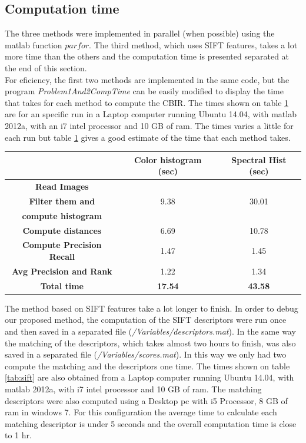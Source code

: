 \documentclass[a4paper,12pt]{article}
\begin{document}
\subsection{Computation time}
The three methods were implemented in parallel (when possible) using the
matlab function $parfor$. The third method, which uses SIFT features,
takes a lot more time than the others and the computation time is presented separated
at the end of this section. \\

For eficiency, the first two methods are implemented in the same code, but the program 
\emph{Problem1And2CompTime} can be easily modified to display the time that
takes for each method to compute the CBIR. The times shown on table \ref{tab:times}
are for an specific run in a Laptop computer running Ubuntu 14.04, with matlab 2012a, 
with an i7 intel processor and 10 GB of ram. The times varies a little for each run
but table \ref{tab:times} gives a good estimate of the time that each method takes.
\begin{table}[h!]
    \centering
    \begin{tabular}{|c|c|c|}
        \hline
        & \textbf{Color histogram (sec)} & \textbf{Spectral Hist (sec)} \\
        \hline
        \textbf{Read Images} & & \\
        \textbf{Filter them and} & 9.38 & 30.01 \\
        \textbf{compute histogram} & & \\
        \hline
        \textbf{Compute distances} & 6.69 & 10.78  \\
        \hline
        \textbf{Compute Precision Recall } & 1.47 & 1.45 \\
        \hline
        \textbf{Avg Precision and Rank} & 1.22 & 1.34 \\
        \hline
        \textbf{Total time} & \textbf{17.54} & \textbf{43.58}\\
        \hline
    \end{tabular}
    \label{tab:times}
\end{table}

The method based on SIFT features take a lot longer to finish. In order to 
debug our proposed method, the computation of the SIFT descriptors were run once
and then saved in a separated file (\emph{/Variables/descriptors.mat}). In the same
way the matching of the descriptors, which takes almost two hours to finish,
was also saved in a separated file (\emph{/Variables/scores.mat}). In this way
we only had two compute the matching and the descriptors one time. The times shown
on table \ref{tab:sift} are also obtained from a Laptop computer running Ubuntu 14.04, with matlab 2012a, 
with i7 intel processor and 10 GB of ram. The matching descriptors were
also computed using a Desktop pc with i5 Processor, 8 GB of ram in windows 7. For this
configuration the average time to calculate each matching descriptor is under 5 seconds and 
the overall computation time is close to 1 hr. 
\end{document}
